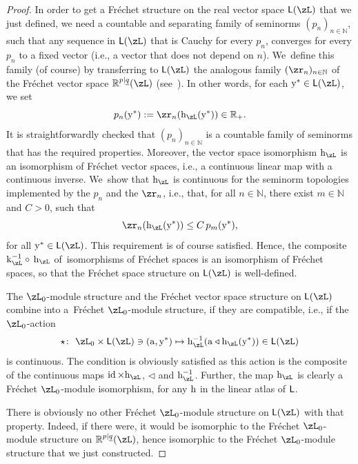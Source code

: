 \documentclass[10pt,a4paper]{amsart}
\newcommand{\op}[1]{\operatorname{#1}}
\newcommand{\R}{{\mathbb R}}
\def\ul{\underline}
\def\ul{\underline}
\newcommand{\0}{\otimes}
\newcommand{\id}{\op{id}}
\numberwithin{equation}{section}
\begin{document}
\begin{proof}
In order to get a Fr\'echet structure on the real vector space ${\sf L}(\zL)$ that we just defined, we need a countable and separating family of seminorms $(p_n)_{n\in\mathbb{N}}$, such that any sequence in ${\sf L}(\zL)$ that is Cauchy for every $p_n$, converges for every $p_n$ to a fixed vector (i.e., a vector that does not depend on $n$). We~define this family (of course) by transferring to ${\sf L}(\zL)$ the analogous family $(\zr_n)_{n\in\mathbb{N}}$ of the Fr\'echet vector space $\R^{p|\ul q}(\zL)$ (see~\cite[Theorem 14]{Bruce:2018}). In other words, for each ${\rm y}^*\in{\sf L}(\zL)$, we set
\[
p_n({\rm y}^*):=\zr_n({\rm h}_\zL({\rm y}^*))\in\R_+.
\]
It is straightforwardly checked that $(p_n)_{n\in\mathbb{N}}$ is a countable family of seminorms that has the required properties. Moreover, the vector space isomorphism ${\rm h}_\zL$ is an isomorphism of Fr\'echet vector spaces, i.e., a continuous linear map with a continuous inverse. We~show that ${\rm h}_\zL$ is continuous for the seminorm topologies implemented by the $p_n$ and the $\zr_n$, i.e., that, for all $n\in\mathbb{N}$, there exist $m\in\mathbb{N}$ and $C>0$, such that
\[
\zr_n({\rm h}_\zL({\rm y}^*))\le C\, p_m({\rm y}^*),
\]
for all ${\rm y}^*\in{\sf L}(\zL)$. This requirement is of course satisfied. Hence, the composite ${\rm k}_\zL^{-1}\circ\, {\rm h}_\zL$ of~isomorphisms of Fr\'echet spaces is an isomorphism of Fr\'echet spaces, so that the Fr\'echet space structure on ${\sf L}(\zL)$ is well-defined.

The $\zL_0$-module structure and the Fr\'echet vector space structure on ${\sf L}(\zL)$ combine into a~Fr\'echet $\zL_0$-module structure, if they are compatible, i.e., if the $\zL_0$-action \begin{gather}\label{L0AL}
\star\colon\ \zL_0\times {\sf L}(\zL)\ni({\rm a},{\rm y}^*)\mapsto {\rm h}_\zL^{-1}({\rm a}\triangleleft{\rm h}_\zL({\rm y}^*))\in {\sf L}(\zL)
\end{gather}
is continuous. The condition is obviously satisfied as this action is the composite of the continuous maps $\id\times {\rm h}_\zL$, $\triangleleft$ and ${\rm h}_\zL^{-1}$. Further, the map ${\rm h}_\zL$ is clearly a Fr\'echet $\zL_0$-module isomorphism, for any $\rm h$ in the linear atlas of $\sf L$.

There is obviously no other Fr\'echet $\zL_0$-module structure on ${\sf L}(\zL)$ with that property. Indeed, if there were, it would be isomorphic to the Fr\'echet $\zL_0$-module structure on $\R^{p|\ul q}(\zL)$, hence isomorphic to the Fr\'echet $\zL_0$-module structure that we just constructed. \end{proof}
\end{document}
